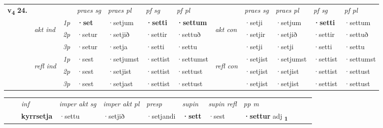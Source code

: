 \begin{tabular}{llllllllllll} \toprule
\multirow{4}{*}{{{\textbf{v{\textsubscript{4}}} \Large{\textbf{24.}}}}}  & &   &  \textit{praes sg}  & \textit{praes pl}  &\textit{ pf sg} & \textit{pf pl} &  &  \textit{praes sg}  & \textit{praes pl}  & \textit{pf sg} & \textit{pf pl } \\*
	\cmidrule{4-7} \cmidrule{9-12}
 & \multirow{3}{*}{\begin{turn}{90}\textit{akt ind}\end{turn}} & {\textit{1p}} & \textbf{·set} & ·setjum    & \textbf{·setti} & \textbf{·settum} & \multirow{3}{*}{\begin{turn}{90}\textit{akt con}\end{turn}} &·setji & ·setjum & \textbf{·setti} & ·settum\\*
& &  {\textit{2p}} &  ·setur  & ·setjið   & ·settir & ·settuð & & ·setjir & ·setjið & ·settir & ·settuð \\*
& &  {\textit{3p}} & ·setur & ·setja   & ·setti & ·settu & & ·setji & ·setji& ·setti & ·settu  \\*
\cmidrule{4-7} \cmidrule{9-12}
 &\multirow{3}{*}{\begin{turn}{90}\textit{refl ind}\end{turn}} & {\textit{1p}} & ·sest & ·setjumst    & ·settist & ·settumst & \multirow{3}{*}{\begin{turn}{90}\textit{refl con}\end{turn}}  &·setjist & ·setjumst & ·settist & ·settumst\\*
 &&  {\textit{2p}} &  ·sest  & ·setjist   & ·settist & ·settust & &·setjist & ·setjist & ·settist & ·settust \\*
& &  {\textit{3p}} & ·sest & ·setjast   & ·settist & ·settust & & ·setjist & ·setjist& ·settist & ·settust  \\*
\cmidrule{4-7} \cmidrule{9-12}
\end{tabular}


\begin{tabular}{llllllllllll}
 & & \textit{inf} & \textit{imper akt sg} & \textit{imper akt pl}   & \textit{presp} & \textit{supin} & \textit{supin refl} & \textit{pp m}     \\*
  & & \textbf{kyrrsetja} & ·settu  & ·setjið   & ·setjandi &  \textbf{·sett} & ·sest & \textbf{·settur} adj \textbf{\textsubscript{1}} \\*
\cmidrule{1-12}
\end{tabular}



